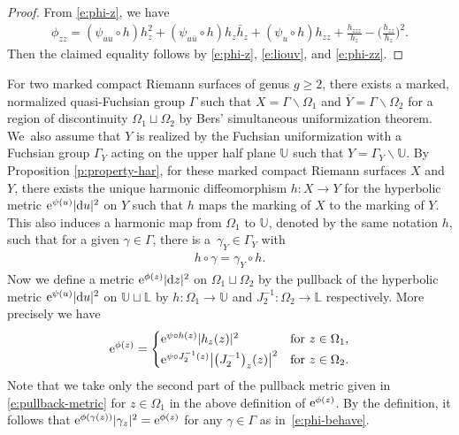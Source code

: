 \documentclass[10pt,a4paper]{amsart}
\numberwithin{equation}{section}
\begin{document}
\begin{proof}From \eqref{e:phi-z}, we have
\begin{gather}\label{e:phi-zz}
\phi_{zz}=(\psi_{uu}\circ h) h_z^2 +(\psi_{u\bar{u}}\circ h) h_z \bar{h}_z +(\psi_u\circ h) h_{zz} +\frac{h_{zzz}}{h_z} -\bigg(\frac{h_{zz}}{h_z}\bigg)^2.
\end{gather}
Then the claimed equality follows by \eqref{e:phi-z}, \eqref{e:liouv}, and \eqref{e:phi-zz}.
\end{proof}

For two marked compact Riemann surfaces of genus $g\ge2$, there exists a marked, normalized quasi-Fuchsian group $\Gamma$ such that $X=\Gamma\backslash \Omega_1$ and $\overline{Y}=\Gamma\backslash \Omega_2$ for a region of discontinuity
$\Omega_1\sqcup \Omega_2$ by Bers' simultaneous uniformization theorem. We~also assume that
$Y$ is realized by the Fuchsian uniformization with a Fuchsian group $\Gamma_Y$ acting on the upper half plane $\mathbb{U}$ such that $Y = \Gamma_Y\backslash \mathbb{U}$. By Proposition \ref{p:property-har}, for these marked compact Riemann surfaces $X$ and $Y$, there exists the unique harmonic diffeomorphism $h\colon X\to Y$ for the hyperbolic metric ${\rm e}^{\psi(u)}|{\rm d}u|^2$ on $Y$ such that $h$ maps the marking of $X$ to the marking of $Y$. This also induces a harmonic map from $\Omega_1$ to $\mathbb{U}$, denoted by the same notation $h$, such that for a given $\gamma\in\Gamma$, there is a~$\gamma_Y\in \Gamma_Y$ with
\begin{gather*}
h\circ \gamma =\gamma_Y \circ h.
\end{gather*}
Now we define a metric ${\rm e}^{\phi(z)}|{\rm d}z|^2$ on $\Omega_1\sqcup \Omega_2$ by the pullback of the hyperbolic metric ${\rm e}^{\psi(u)}|{\rm d}u|^2$ on $\mathbb{U}\sqcup \mathbb{L}$ by $h\colon \Omega_1\to\mathbb{U}$
and $J^{-1}_2\colon \Omega_2\to \mathbb{L}$ respectively.
More precisely we have
\begin{gather*}
{\rm e}^{\phi(z)}=\begin{cases}
{\rm e}^{\psi\circ h(z)} |h_z(z)|^2 &\text{for} \ z\in \Omega_1,
\\[.5ex]
 {\rm e}^{\psi\circ J_2^{-1}(z)} \big|\big(J_2^{-1}\big)_z(z)\big|^2 &\text{for} \ z\in \Omega_2.
 \end{cases}
\end{gather*}
Note that we take only the second part of the pullback metric given in \eqref{e:pullback-metric} for $z\in \Omega_1$ in the above definition of ${\rm e}^{\phi(z)}$. By the definition, it follows that ${\rm e}^{\phi(\gamma(z))} |\gamma_z|^2 = {\rm e}^{\phi(z)}$ for any $\gamma\in\Gamma$ as in~\eqref{e:phi-behave}.
\end{document}
